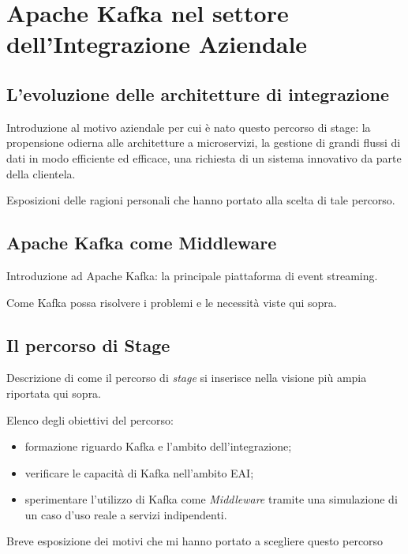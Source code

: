 \chapter{Apache Kafka nel settore dell’Integrazione Aziendale}

\section{L’evoluzione delle architetture di integrazione}

Introduzione al motivo aziendale per cui è nato questo percorso di stage: la propensione odierna alle architetture a microservizi, la gestione di grandi flussi di dati in modo efficiente ed efficace, una richiesta di un sistema innovativo da parte della clientela.

\bigskip\noindent
Esposizioni delle ragioni personali che hanno portato alla scelta di tale percorso.


\section{Apache Kafka come Middleware}

Introduzione ad Apache Kafka: la principale piattaforma di event streaming.

\bigskip\noindent
Come Kafka possa risolvere i problemi e le necessità viste qui sopra.

\section{Il percorso di Stage}

Descrizione di come il percorso di \textit{stage} si inserisce nella visione più ampia riportata qui sopra.

\bigskip\noindent
Elenco degli obiettivi del percorso:
\begin{itemize}
  \item formazione riguardo Kafka e l’ambito dell’integrazione;
  \item verificare le capacità di Kafka nell’ambito EAI;
  \item sperimentare l’utilizzo di Kafka come \textit{Middleware} tramite una simulazione di un caso d’uso reale a servizi indipendenti.
\end{itemize}

\noindent
Breve esposizione dei motivi che mi hanno portato a scegliere questo percorso
